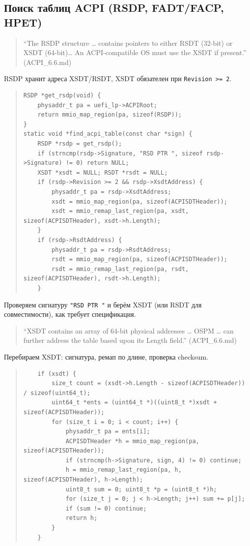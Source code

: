 \documentclass[a4paper,12pt]{article}
\begin{document}
\subsection{Поиск таблиц ACPI (RSDP, FADT/FACP, HPET)}

\begin{quote}
``The RSDP structure … contains pointers to either RSDT (32-bit) or XSDT (64-bit)… An ACPI-compatible OS must use the XSDT if present.'' (ACPI\_6.6.md)
\end{quote}
RSDP хранит адреса XSDT/RSDT, XSDT обязателен при \texttt{Revision >= 2}.
\begin{quote}\begin{verbatim}
RSDP *get_rsdp(void) {
    physaddr_t pa = uefi_lp->ACPIRoot;
    return mmio_map_region(pa, sizeof(RSDP));
}
static void *find_acpi_table(const char *sign) {
    RSDP *rsdp = get_rsdp();
    if (strncmp(rsdp->Signature, "RSD PTR ", sizeof rsdp->Signature) != 0) return NULL;
    XSDT *xsdt = NULL; RSDT *rsdt = NULL;
    if (rsdp->Revision >= 2 && rsdp->XsdtAddress) {
        physaddr_t pa = rsdp->XsdtAddress;
        xsdt = mmio_map_region(pa, sizeof(ACPISDTHeader));
        xsdt = mmio_remap_last_region(pa, xsdt, sizeof(ACPISDTHeader), xsdt->h.Length);
    }
    if (rsdp->RsdtAddress) {
        physaddr_t pa = rsdp->RsdtAddress;
        rsdt = mmio_map_region(pa, sizeof(ACPISDTHeader));
        rsdt = mmio_remap_last_region(pa, rsdt, sizeof(ACPISDTHeader), rsdt->h.Length);
    }
\end{verbatim}\end{quote}
Проверяем сигнатуру \texttt{"RSD PTR "} и берём XSDT (или RSDT для совместимости), как требует спецификация.

\begin{quote}
``XSDT contains an array of 64-bit physical addresses … OSPM … can further address the table based upon its Length field.'' (ACPI\_6.6.md)
\end{quote}
Перебираем XSDT: сигнатура, ремап по длине, проверка checksum.
\begin{quote}\begin{verbatim}
    if (xsdt) {
        size_t count = (xsdt->h.Length - sizeof(ACPISDTHeader)) / sizeof(uint64_t);
        uint64_t *ents = (uint64_t *)((uint8_t *)xsdt + sizeof(ACPISDTHeader));
        for (size_t i = 0; i < count; i++) {
            physaddr_t pa = ents[i];
            ACPISDTHeader *h = mmio_map_region(pa, sizeof(ACPISDTHeader));
            if (strncmp(h->Signature, sign, 4) != 0) continue;
            h = mmio_remap_last_region(pa, h, sizeof(ACPISDTHeader), h->Length);
            uint8_t sum = 0; uint8_t *p = (uint8_t *)h;
            for (size_t j = 0; j < h->Length; j++) sum += p[j];
            if (sum != 0) continue;
            return h;
        }
    }
\end{verbatim}\end{quote}
\end{document}
